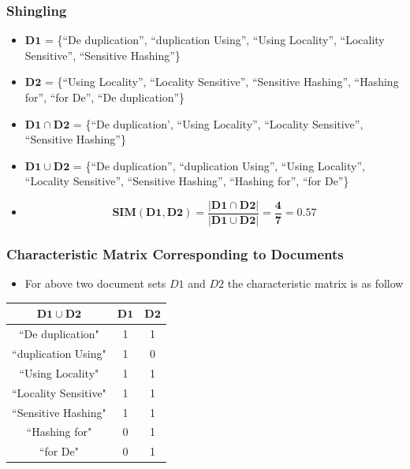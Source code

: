 \documentclass[15pt,t]{beamer}
\begin{document}
\begin{frame}
		\frametitle{Shingling} 
		\begin{itemize}[topsep=0pt,itemsep=0ex,partopsep=1ex,parsep=1ex]
			\item [$\square$] $\bm{D1}$ = \{“De duplication”, “duplication Using”, “Using Locality”, “Locality Sensitive”, “Sensitive
				Hashing”\} \\
			\item [$\square$] $\bm{D2}$ = \{“Using Locality”, “Locality Sensitive”, “Sensitive Hashing”, “Hashing for”, “for De”, “De duplication”\} 
			\item [$\square$] $\bm{D1 \cap D2}$ = \{“De duplication’, “Using Locality”, “Locality Sensitive”, “Sensitive Hashing”\}  
			\item [$\square$] $\bm{D1 \cup D2}$ = \{“De duplication”, “duplication Using”, “Using Locality”, “Locality Sensitive”, “Sensitive Hashing”, “Hashing for”, “for De”\}
			\item	$$ \bm{	SIM(D1,D2) = \frac{|D1 \cap D2|}{|D1 \cup D2|} = \frac{4}{7} = 0.57} $$
		\end{itemize}
\end{frame}
\begin{frame}
\frametitle{Characteristic Matrix Corresponding to Documents}
	\begin{itemize}
			\item [$\square$] For above two document sets $D1$ and $D2$ the characteristic matrix is as follow
	\end{itemize}
	\pause
	\begin{table}[H]
		\begin{center}
			\begin{tabular}{|c|c|c|}
			\hline
			$\bm{D1 \cup D2}$ &$\bm{ D1}$ &$\bm{ D2}$\\
			\hline
			``De duplication"&1 & 1 \\
			\hline
			``duplication Using"& 1  & 0 \\
			\hline
			``Using Locality" & 1 & 1\\
			\hline
			``Locality Sensitive"&1 & 1\\
			\hline
			``Sensitive Hashing"& 1 & 1 \\
			\hline
			``Hashing for"& 0 & 1 \\
			\hline
			``for De"& 0 & 1 \\
			\hline
			\end{tabular}
		\end{center}
	\end{table}
\end{frame}
\end{document}
